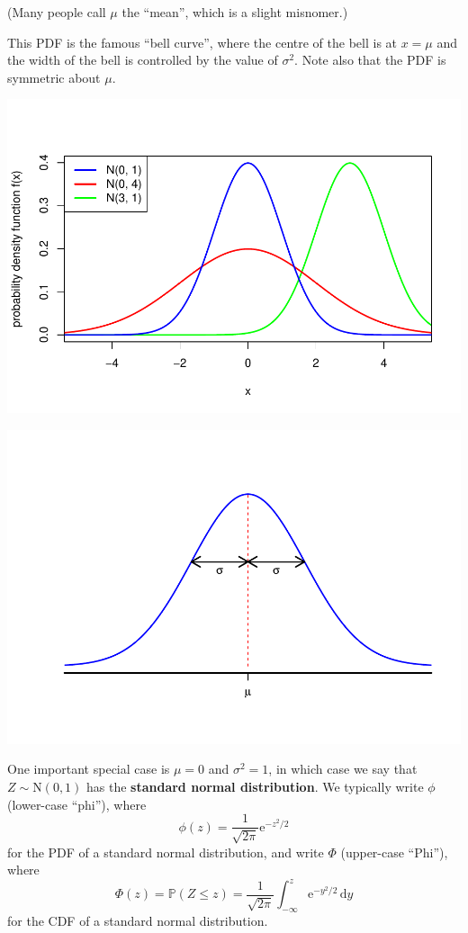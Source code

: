 \documentclass[
  a4paper,
]{book}
\theoremstyle{definition}
\theoremstyle{definition}
\theoremstyle{definition}
\theoremstyle{definition}
\theoremstyle{remark}
\begin{document}
(Many people call \(\mu\) the ``mean'', which is a slight misnomer.)

This PDF is the famous ``bell curve'', where the centre of the bell is at \(x = \mu\) and the width of the bell is controlled by the value of \(\sigma^2\). Note also that the PDF is symmetric about \(\mu\).

\includegraphics{math1710_files/figure-latex/norm-pic-1-1.pdf}

\includegraphics{math1710_files/figure-latex/norm-pic-2-1.pdf}

One important special case is \(\mu = 0\) and \(\sigma^2 = 1\), in which case we say that \(Z \sim \mathrm N(0,1)\) has the \textbf{standard normal distribution}. We typically write \(\phi\) (lower-case ``phi''), where
\[ \phi(z) = \frac{1}{\sqrt{2\pi}} \mathrm e^{-z^2/2} \]
for the PDF of a standard normal distribution, and write \(\Phi\) (upper-case ``Phi''), where
\[ \Phi(z) = \mathbb P(Z \leq z) = \frac{1}{\sqrt{2\pi}} \int_{-\infty}^z \mathrm e^{-y^2/2}\, \mathrm dy \]
for the CDF of a standard normal distribution.
\end{document}

